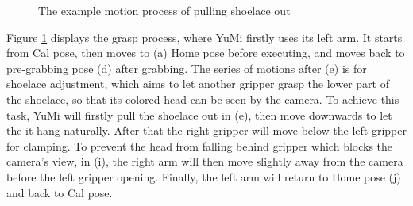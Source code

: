 \begin{figure}[H]
\caption{The example motion process of pulling shoelace out}
\label{pickexample}
\end{figure}

Figure \ref{pickexample} displays the grasp process, where YuMi firstly uses its left arm. It starts from Cal pose, then moves to (a) Home pose before executing, and moves back to pre-grabbing pose (d) after grabbing. 
The series of motions after (e) is for shoelace adjustment, which aims to let another gripper grasp the lower part of the shoelace, so that its colored head can be seen by the camera. To achieve this task, YuMi will firstly pull the shoelace out in (e), then move downwards to let the it hang naturally. After that the right gripper will move below the left gripper for clamping. To prevent the head from falling behind gripper which blocks the camera's view, in (i), the right arm will then move slightly away from the camera before the left gripper opening. Finally, the left arm will return to Home pose (j) and back to Cal pose. 

